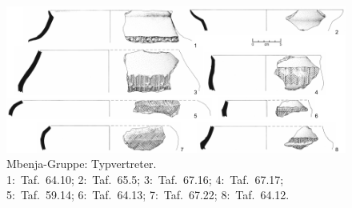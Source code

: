 \begin{figure}[!tb]
	\centering
	\includegraphics[width=\textwidth]{fig/MBJ-Typen.pdf}
	\caption{Mbenja-Gruppe: Typvertreter.\\1:~Taf.~64.10; 2:~Taf.~65.5; 3:~Taf.~67.16; 4:~Taf.~67.17; 5:~Taf.~59.14; 6:~Taf.~64.13; 7:~Taf.~67.22; 8:~Taf.~64.12.}
	\label{fig:MBJ_Typverteter}
\end{figure}

